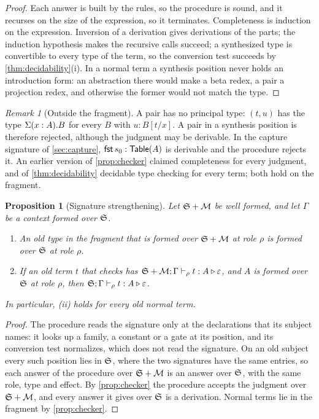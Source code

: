 \documentclass[11pt]{article}
\numberwithin{equation}{section}
\theoremstyle{definition}
\theoremstyle{plain}
\newtheorem{proposition}[definition]{Proposition}
\theoremstyle{remark}
\newtheorem{remark}[definition]{Remark}
\newcommand{\eps}{\varepsilon}
\newcommand{\fst}{\AFFst}
\begin{document}
\begin{proof}
Each answer is built by the rules, so the procedure is sound, and it recurses
on the size of the expression, so it terminates.  Completeness is induction
on the expression.  Inversion of a derivation gives derivations of the parts;
the induction hypothesis makes the recursive calls succeed; a synthesized type
is convertible to every type of the term, so the conversion test succeeds by
\cref{thm:decidability}(i).  In a normal term a synthesis position never holds
an introduction form: an abstraction there would make a beta redex, a pair a
projection redex, and otherwise the former would not match the type.
\end{proof}

\begin{remark}[Outside the fragment]\label{rem:fragment}
A pair has no principal type: \((t,u)\) has the type
\(\Sigma(x:A).B\) for every \(B\) with \(u:B[t/x]\).  A pair in a
synthesis position is therefore rejected, although the judgment may be
derivable.  In the capture signature of \cref{sec:capture},
\(\fst\,s_0:\mathsf{Table}(A)\) is derivable and the procedure rejects it.
An earlier version of \cref{prop:checker} claimed completeness for every
judgment, and of \cref{thm:decidability} decidable type checking for every
term; both hold on the fragment.
\end{remark}

\begin{proposition}[Signature strengthening]\label{prop:strengthening}
Let \({\mathfrak S}+\mathcal M\) be well formed, and let \(\Gamma\) be a
context formed over \({\mathfrak S}\).
\begin{enumerate}[label=(\roman*),leftmargin=2.5em]
\item An old type in the fragment that is formed over
\({\mathfrak S}+\mathcal M\) at role \(\rho\) is formed over
\({\mathfrak S}\) at role \(\rho\).
\item If an old term \(t\) that checks has
\(\AFDeclSignature+\mathcal M;\Gamma\vdash_{\rho}t:A\triangleright\eps\), and
\(A\) is formed over \({\mathfrak S}\) at role \(\rho\), then
\(\AFDeclSignature;\Gamma\vdash_{\rho}t:A\triangleright\eps\).
\end{enumerate}
In particular, (ii) holds for every old normal term.
\end{proposition}

\begin{proof}
The procedure reads the signature only at the declarations that its subject
names: it looks up a family, a constant or a gate at its position, and its
conversion test normalizes, which does not read the signature.  On an old
subject every such position lies in \({\mathfrak S}\), where the two
signatures have the same entries, so each answer of the procedure over
\({\mathfrak S}+\mathcal M\) is an answer over \({\mathfrak S}\), with
the same role, type and effect.  By \cref{prop:checker} the procedure accepts
the judgment over \({\mathfrak S}+\mathcal M\), and every answer it gives
over \({\mathfrak S}\) is a derivation.  Normal terms lie in the fragment
by \cref{prop:checker}.
\end{proof}
\end{document}
